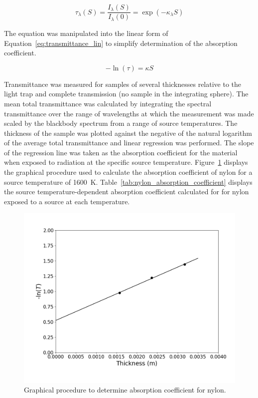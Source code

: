 \documentclass[12pt,oneside]{book}
\begin{document}
\begin{equation}
\tau_\lambda(S) = \frac{I_\lambda(S)}{I_\lambda(0)} = \exp\left(-\kappa_\lambda{S}\right) \label{eq:transmittance}
\end{equation}

The equation was manipulated into the linear form of Equation~\ref{eq:transmittance_lin} to simplify determination of the absorption coefficient.

\begin{equation}
-\ln\left(\tau\right) = \kappa{S} \label{eq:transmittance_lin}
\end{equation}

Transmittance was measured for samples of several thicknesses relative to the light trap and complete transmission (no sample in the integrating sphere). The mean total transmittance was calculated by integrating the spectral transmittance over the range of wavelengths at which the measurement was made scaled by the blackbody spectrum from a range of source temperatures. The thickness of the sample was plotted against the negative of the natural logarithm of the average total transmittance and linear regression was performed. The slope of the regression line was taken as the absorption coefficient for the material when exposed to radiation at the specific source temperature. Figure~\ref{fig:nylon_absorption_coefficient} displays the graphical procedure used to calculate the absorption coefficient of nylon for a source temperature of 1600~K. Table~\ref{tab:nylon_absorption_coefficient} displays the source temperature-dependent absorption coefficient calculated for for nylon exposed to a source at each temperature.

\begin{figure}[!ht]
\centering
\includegraphics[width=.75\columnwidth]{Figures/Nylon_Absorption_coefficient.png}
\caption[Graphical Procedure to Determine Absorption Coefficient for Nylon]{Graphical procedure to determine absorption coefficient for nylon.}
\label{fig:nylon_absorption_coefficient}
\end{figure}
\end{document}
